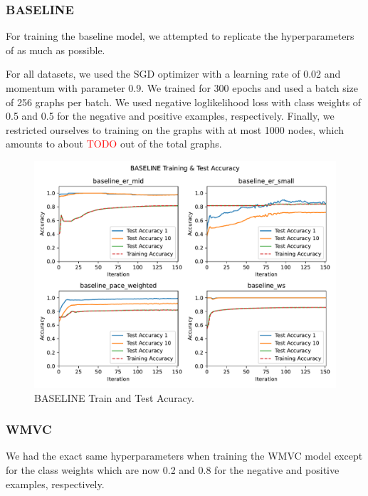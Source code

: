 \documentclass{article}
\begin{document}
\subsubsection{BASELINE}
For training the baseline model,
we attempted to replicate the hyperparameters of \citet{langedal_et_al}
as much as possible.

For all datasets,
we used the SGD optimizer with a learning rate of 0.02 and momentum with parameter 0.9.
We trained for 300 epochs
and used a batch size of 256 graphs per batch.
We used negative loglikelihood loss
with class weights of 0.5 and 0.5 for the negative and positive examples,
respectively.
Finally,
we restricted ourselves to training on the graphs with at most 1000 nodes,
which amounts to about \textcolor{red}{TODO} out of the total graphs.

\begin{figure}
     \centering
     \includegraphics[width=\textwidth]{figures/baseline_test}
     \caption{BASELINE Train and Test Acuracy.}
     \label{fig:baseline_test}
\end{figure}

\subsubsection{WMVC}
We had the exact same hyperparameters
when training the WMVC model
except for the class weights which are now 0.2 and 0.8
for the negative and positive examples,
respectively.
\end{document}
